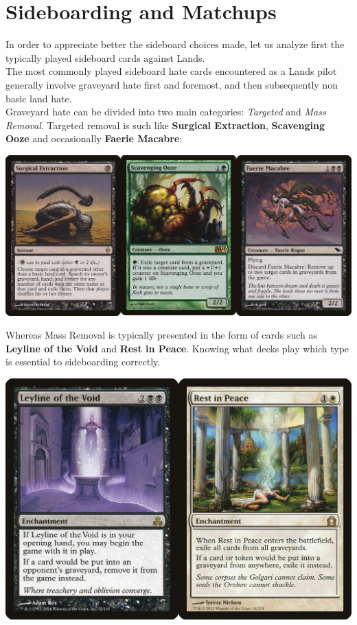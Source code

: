 \documentclass{report}
\begin{document}
\chapter{Sideboarding and Matchups}
In order to appreciate better the sideboard choices made, let us analyze first the typically played sideboard cards against Lands.\\
The most commonly played sideboard hate cards encountered as a Lands pilot generally involve graveyard hate first and foremost, and then subsequently non basic land hate.\\ Graveyard hate can be divided into two main categories: \emph{Targeted} and \emph{Mass Removal}. Targeted removal is such like \textbf{Surgical Extraction}, \textbf{Scavenging Ooze} and  occasionally \textbf{Faerie Macabre}:
\begin{center}
\includegraphics [width = \textwidth] {extraction-scooze-faerie}
\end{center}
Whereas Mass Removal is typically presented in the form of cards such as \textbf{Leyline of the Void} and \textbf{Rest in Peace}. Knowing what decks play which type is essential to sideboarding correctly.\\
\begin{center}
\includegraphics [width = \textwidth] {void-rip}
\end{center}
\end{document}
